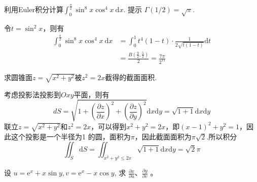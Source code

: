 \begin{exercise}
    利用Euler积分计算$\int_0^{\frac{\pi}{2}} \sin ^8 x \cos ^4 x \mathrm{~d} x$. 提示 $\Gamma(1 / 2)=\sqrt{\pi}$.
\end{exercise}
\begin{solution}
    令$t=\sin^2x$，则有
    \begin{align*}
        \int_0^{\frac{\pi}{2}} \sin ^8 x \cos ^4 x \mathrm{~d} x&=\int_0^1 t^4(1-t)\cdot \frac{1}{2\sqrt{t(1-t)}}\mathrm{d}t\\
        &=\frac{B(\frac{9}{2},\frac{5}{2})}{2}=\frac{7\pi}{2^{11}}
    \end{align*}
\end{solution}
\begin{exercise}
    求圆锥面$z=\sqrt{x^2+y^2}$被$z^2=2x$截得的截面面积.
\end{exercise}
\begin{solution}
    考虑投影法投影到$Oxy$平面，则有
    \[
    dS=\sqrt{1+\left(\frac{\partial z}{\partial x}\right)^2+\left(\frac{\partial z}{\partial y}\right)^2}\mathrm{d}x\mathrm{d}y=\sqrt{1+1}\mathrm{d}x\mathrm{d}y
    \]
    联立$z=\sqrt{x^2+y^2}$和$z^2=2x$，可以得到$x^2+y^2=2x$，即$(x-1)^2+y^2=1$，因此这个投影是一个半径为1 的圆，面积为$\pi$，因此截面面积为$\pi\sqrt{2}$.所以积分
    \[
    \iint_S\mathrm{d}S=\iint_{x^2+y^2\leq 2x}\sqrt{1+1}\mathrm{d}x\mathrm{d}y=\sqrt{2}\pi
    \]
\end{solution}
\begin{exercise}
    设 $u=\mathrm{e}^x+x \sin y, v=\mathrm{e}^x-x \cos y$, 求 $\frac{\partial x}{\partial u} 、 \frac{\partial y}{\partial v}$ 。
\end{exercise}

